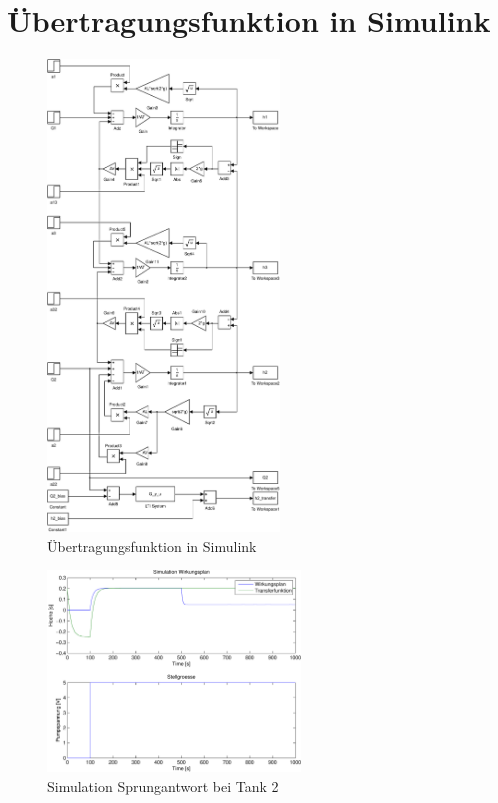 \section{Übertragungsfunktion in Simulink}
\begin{figure}[h!]
    \centering
    \includegraphics[width=0.55\textwidth]{05/transfer_mdl.pdf}
    \caption{Übertragungsfunktion in Simulink}
    \label{fig:05_mdl}
\end{figure}
\begin{figure}[h!]
    \centering
    \includegraphics[width=0.6\textwidth]{05/sim_0.pdf}
    \caption{Simulation Sprungantwort bei Tank 2}
    \label{fig:05_sim}
\end{figure}



